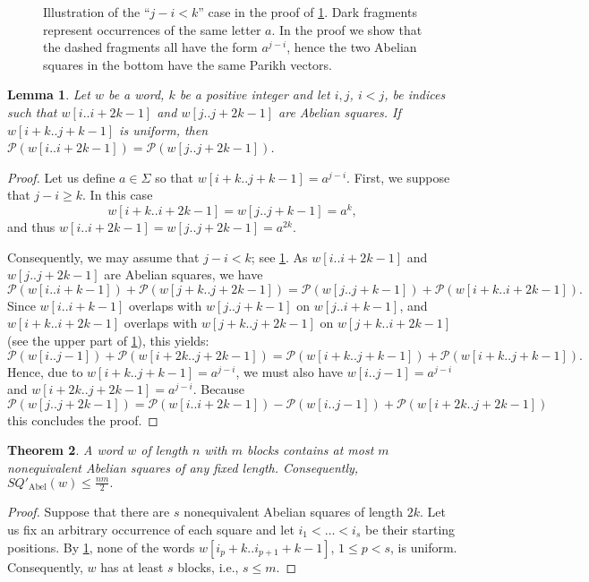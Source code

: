 \documentclass{article}
\theoremstyle{plain}
\newtheorem{theorem}{Theorem}[section]
\newtheorem{lemma}[theorem]{Lemma}
\theoremstyle{definition}
\theoremstyle{remark}
\renewcommand{\P}{\mathcal{P}}
\newcommand{\SQ}{\mathit{SQ}}
\newcommand{\SQPABEL}{\SQ'_{\mathrm{Abel}}}
\begin{document}
\begin{figure}[b]
\begin{tikzpicture}[scale=0.75]
\end{tikzpicture}
  \caption{
   Illustration of the ``$j-i < k$'' case in the proof of \cref{lem:uniform}.
   Dark fragments represent occurrences of the same letter $a$.
   In the proof we show that the dashed fragments all have the form $a^{j-i}$, hence the two Abelian squares
   in the bottom have the same Parikh vectors.
 }\label{fig:uni}
\end{figure}

  \begin{lemma}\label{lem:uniform}
  Let $w$ be a word, $k$ be a positive integer and let $i,j$, $i<j$, be indices such that $w[i..i+2k-1]$ and $w[j..j+2k-1]$
  are Abelian squares. If $w[i+k..j+k-1]$ is uniform, then $\P(w[i..i+2k-1])=\P(w[j..j+2k-1])$.
  \end{lemma}
  \begin{proof}
  Let us define $a\in \Sigma$ so that $w[i+k..j+k-1]=a^{j-i}$.
  First, we suppose that $j-i\ge k$. 
  In this case 
  \[w[i+k..i+2k-1]=w[j..j+k-1]=a^k,\]
  and thus $w[i..i+2k-1]=w[j..j+2k-1]=a^{2k}$.
  
  Consequently, we may assume that $j-i < k$; see \cref{fig:uni}. As $w[i..i+2k-1]$ and $w[j..j+2k-1]$ are Abelian squares, we have
  \[\P(w[i..i+k-1])+\P(w[j+k..j+2k-1])=\P(w[j..j+k-1])+\P(w[i+k..i+2k-1]).\]
  Since $w[i..i+k-1]$ overlaps with $w[j..j+k-1]$ on $w[j..i+k-1]$, and $w[i+k..i+2k-1]$ overlaps with $w[j+k..j+2k-1]$ on $w[j+k..i+2k-1]$
  (see the upper part of \cref{fig:uni}), this yields:
  \[ \P(w[i..j-1])+\P(w[i+2k..j+2k-1])=\P(w[i+k..j+k-1])+\P(w[i+k..j+k-1]).\]
  Hence, due to $w[i+k..j+k-1]=a^{j-i}$, we must also have $w[i..j-1]=a^{j-i}$ and $w[i+2k..j+2k-1]=a^{j-i}$.
  Because
  \[\P(w[j..j+2k-1])=\P(w[i..i+2k-1])-\P(w[i..j-1])+\P(w[i+2k..j+2k-1])\]
  this concludes the proof.  
  \end{proof}
  
  \begin{theorem}\label{thm:ab-upper-bound-k-blocks}
    A word $w$ of length $n$ with $m$ blocks contains at most $m$ non\-equivalent Abelian squares of any fixed length. 
    Consequently, $\SQPABEL(w) \le \tfrac{nm}{2}.$
  \end{theorem}
  \begin{proof}
    Suppose that there are $s$ nonequivalent Abelian squares of length $2k$.  
    Let us fix an arbitrary occurrence of each square and let $i_1<\dots < i_s$ be their starting positions. 
    By \cref{lem:uniform}, none of the words $w[i_p+k..i_{p+1}+k-1]$, $1\le p < s$, is uniform. 
    Consequently, $w$ has at least $s$ blocks, i.e., $s \le m$.
  \end{proof}
\end{document}
